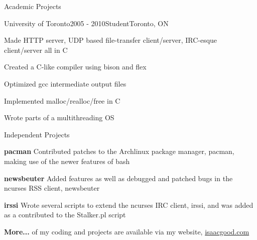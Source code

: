 \documentclass{resume}
\begin{document}
  \begin{rSection}{Academic Projects}
    \begin{rSubsection}{University of Toronto}{2005 - 2010}{Student}{Toronto, ON}
      \item Made HTTP server, UDP based file-transfer client/server, IRC-esque client/server all in C
      \item Created a C-like compiler using bison and flex
      \item Optimized gcc intermediate output files
      \item Implemented malloc/realloc/free in C
      \item Wrote parts of a multithreading OS
    \end{rSubsection}
  \end{rSection}

  \begin{rSection}{Independent Projects}
    \begin{rSubsection}{}{}{}{}
      \item \textbf{pacman} Contributed patches to the Archlinux package manager, pacman, making use of the newer features of bash
      \item \textbf{newsbeuter} Added features as well as debugged and patched bugs in the ncurses RSS client, newsbeuter
      \item \textbf{irssi} Wrote several scripts to extend the ncurses IRC client, irssi, and was added as a contributed to the Stalker.pl script
      \item \textbf{More...} of my coding and projects are available via my website, \href{http://www.isaacgood.com/}{isaacgood.com}
    \end{rSubsection}
  \end{rSection}
\end{document}
